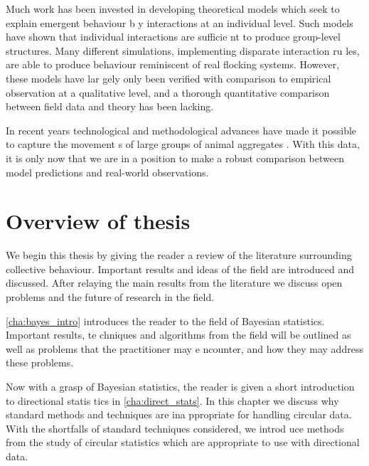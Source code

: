 Much work has been invested in developing theoretical models which seek to explain emergent behaviour b
y interactions at an individual level. Such models have shown that individual interactions are sufficie
nt to produce group-level structures. Many different simulations, implementing disparate interaction ru
les, are able to produce behaviour reminiscent of real flocking systems. However, these models have lar
gely only been verified with comparison to empirical observation at a qualitative level, and a thorough
 quantitative comparison between field data and theory has been lacking.

In recent years technological and methodological advances have made it possible to capture the movement
s of large groups of animal aggregates \parencite{ballerini08}. With this data, it is only now that we 
are in a position to make a robust comparison between model predictions and real-world observations.

\section{Overview of thesis}
\label{sec:overview_of_thesis}

We begin this thesis by giving the reader a review of the literature surrounding collective behaviour. 
Important results and ideas of the field are introduced and discussed. After relaying the main results 
from the literature we discuss open problems and the future of research in the field.

\cref{cha:bayes_intro} introduces the reader to the field of Bayesian statistics. Important results, te
chniques and algorithms from the field will be outlined as well as problems that the practitioner may e
ncounter, and how they may address these problems.

Now with a grasp of Bayesian statistics, the reader is given a short introduction to directional statis
tics in \cref{cha:direct_stats}. In this chapter we discuss why standard methods and techniques are ina
ppropriate for handling circular data. With the shortfalls of standard techniques considered, we introd
uce methods from the study of circular statistics which are appropriate to use with directional data.
